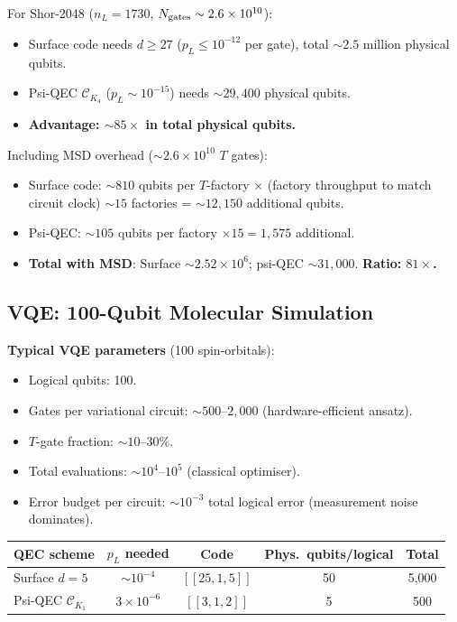 \documentclass[11pt]{article}
\theoremstyle{definition}
\theoremstyle{remark}
\newcommand{\CK}{\mathcal{C}_K}
\newcommand{\ee}[1]{\times 10^{#1}}
\begin{document}
For Shor-2048 ($n_L = 1730$, $N_{\rm gates} \sim 2.6\ee{10}$):
\begin{itemize}[nosep]
  \item Surface code needs $d \geq 27$ ($p_L \leq 10^{-12}$ per gate),
    total $\sim 2.5$ million physical qubits.
  \item Psi-QEC $\CK_4$ ($p_L \sim 10^{-15}$) needs $\sim 29{,}400$
    physical qubits.
  \item \textbf{Advantage: $\sim 85\times$ in total physical qubits.}
\end{itemize}

Including MSD overhead ($\sim 2.6\ee{10}$ $T$ gates):
\begin{itemize}[nosep]
  \item Surface code: $\sim 810$ qubits per $T$-factory
    $\times$ (factory throughput to match circuit clock) $\sim 15$
    factories = $\sim 12{,}150$ additional qubits.
  \item Psi-QEC: $\sim 105$ qubits per factory $\times 15 = 1{,}575$
    additional.
  \item \textbf{Total with MSD}: Surface $\sim 2.52\ee{6}$;
    psi-QEC $\sim 31{,}000$.  \textbf{Ratio: $81\times$.}
\end{itemize}

\subsection{VQE: 100-Qubit Molecular Simulation}
\label{sec:vqe-100}

\textbf{Typical VQE parameters} (100 spin-orbitals):
\begin{itemize}[nosep]
  \item Logical qubits: 100.
  \item Gates per variational circuit: $\sim 500$--$2{,}000$
    (hardware-efficient ansatz).
  \item $T$-gate fraction: $\sim 10$--$30\%$.
  \item Total evaluations: $\sim 10^4$--$10^5$ (classical optimiser).
  \item Error budget per circuit: $\sim 10^{-3}$ total logical error
    (measurement noise dominates).
\end{itemize}

\begin{center}
\begin{tabular}{@{}lcccc@{}}
\toprule
QEC scheme & $p_L$ needed & Code & Phys.\ qubits/logical & Total \\
\midrule
Surface $d=5$ & $\sim 10^{-4}$ & $[[25,1,5]]$ & 50 & 5{,}000 \\
Psi-QEC $\CK_1$ & $3\ee{-6}$ & $[[3,1,2]]$ & 5 & 500 \\
\bottomrule
\end{tabular}
\end{center}
\end{document}
